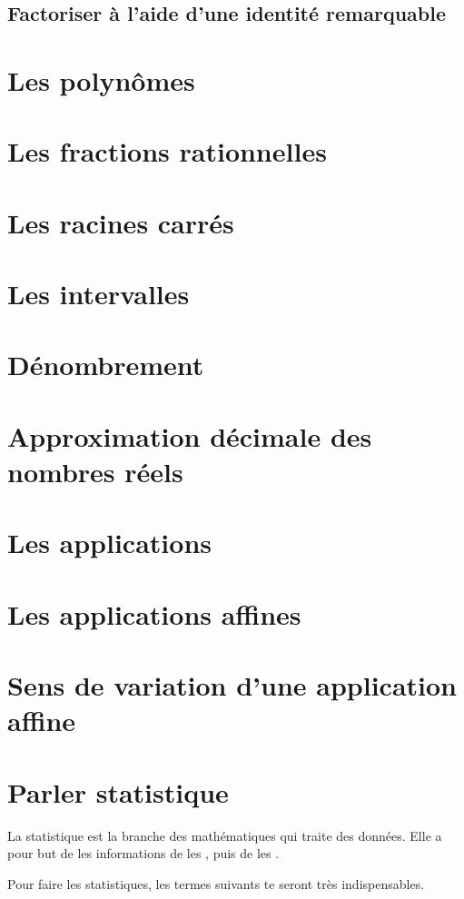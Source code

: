 \documentclass[12pt,a4paper]{report}
\begin{document}
\section{Factoriser à l'aide d'une identité remarquable}

\chapter{Les polynômes}

\chapter{Les fractions rationnelles}

\chapter{Les racines carrés}

\chapter{Les intervalles}

\chapter{Dénombrement}

\chapter{Approximation décimale des nombres réels}

\chapter{Les applications}

\chapter{Les applications affines}

\chapter{Sens de variation d'une application affine}

\chapter{Parler statistique}
La statistique est la branche des mathématiques qui traite des données. Elle a pour but de  les informations de les , puis de les .
\par
Pour faire les statistiques, les termes suivants te seront très indispensables.
\end{document}
